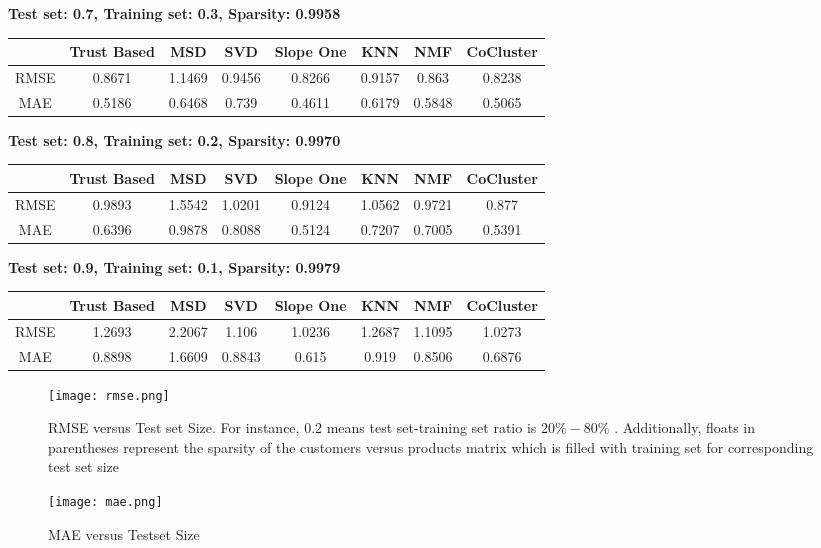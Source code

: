 	\vspace{1cm}
	\textbf{Test set: 0.7, Training set: 0.3, Sparsity: 0.9958}
	\begin{center}
	\begin{tabular}{ | c | c | c | c | c | c | c | c |}
		\hline
		& Trust Based & MSD & SVD & Slope One & KNN & NMF & CoCluster\\ 
		\hline
		RMSE&0.8671  & 1.1469  & 0.9456  & 0.8266  & 0.9157  & 0.863  & 0.8238\\
		\hline
		MAE&0.5186  & 0.6468  & 0.739  & 0.4611  & 0.6179  & 0.5848  & 0.5065\\
		\hline
	\end{tabular}
	\end{center} 
	\vspace{1cm}
	\textbf{Test set: 0.8, Training set: 0.2, Sparsity: 0.9970}
	\begin{center}
	\begin{tabular}{ | c | c | c | c | c | c | c | c |}
		\hline
		& Trust Based & MSD & SVD & Slope One & KNN & NMF & CoCluster\\ 
		\hline
		RMSE&0.9893  & 1.5542  & 1.0201  & 0.9124  & 1.0562  & 0.9721  & 0.877\\
		\hline
		MAE&0.6396  & 0.9878  & 0.8088  & 0.5124  & 0.7207  & 0.7005  & 0.5391\\
		\hline
	\end{tabular}
	\end{center} 
	\vspace{1cm}
	\textbf{Test set: 0.9, Training set: 0.1, Sparsity: 0.9979}
	\begin{center}
	\begin{tabular}{ | c | c | c | c | c | c | c | c |}
		\hline
		& Trust Based & MSD & SVD & Slope One & KNN & NMF & CoCluster\\ 
		\hline
		RMSE&1.2693  & 2.2067  & 1.106  & 1.0236  & 1.2687  & 1.1095  & 1.0273\\
		\hline
		MAE&0.8898  & 1.6609  & 0.8843  & 0.615  & 0.919  & 0.8506  & 0.6876\\
		\hline
	\end{tabular}
	\end{center} 

\begin{figure}[H]
	\centering
	\texttt{[image: rmse.png]}
	\vspace{-0.5cm}
	\caption{RMSE versus Test set Size. For instance, 0.2 means test set-training set ratio is $20\%-80\%$ . Additionally, floats in parentheses represent the sparsity of the customers versus products matrix which is filled with training set for corresponding test set size}
	\label{fig:rmse}
\end{figure}

\begin{figure}[H]
	\centering
	\texttt{[image: mae.png]}
	\vspace{-0.5cm}
	\caption{MAE versus Testset Size}
	\label{fig:mae}
\end{figure}